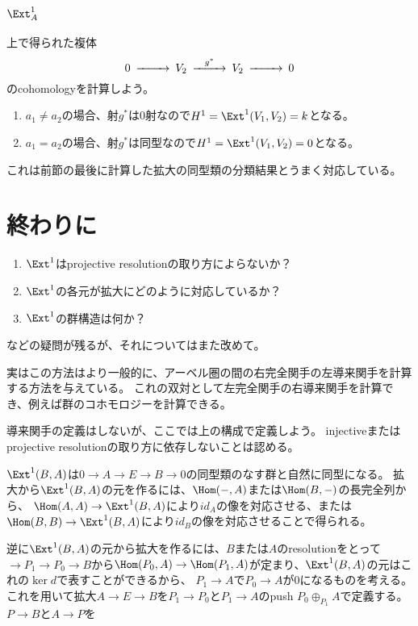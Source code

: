 \documentclass{jsarticle}
\begin{document}
\subsection{$\Ext^1_A$}
上で得られた複体
\[
\begin{CD}
0 @>>> V_2 @>g^*>> V_2 @>>> 0\\
\end{CD}
\]
のcohomologyを計算しよう。
\begin{enumerate}
\item $a_1\neq a_2$の場合、射$g^*$は$0$射なので$H^1=\Ext^1(V_1, V_2)=k$となる。
\item $a_1=a_2$の場合、射$g^*$は同型なので$H^1=\Ext^1(V_1, V_2)=0$となる。
\end{enumerate}

これは前節の最後に計算した拡大の同型類の分類結果とうまく対応している。

\section{終わりに}
\begin{enumerate}
\item $\Ext^1$はprojective resolutionの取り方によらないか？
\item $\Ext^1$の各元が拡大にどのように対応しているか？
\item $\Ext^1$の群構造は何か？
\end{enumerate}
などの疑問が残るが、それについてはまた改めて。

実はこの方法はより一般的に、アーベル圏の間の右完全関手の左導来関手を計算する方法を与えている。
これの双対として左完全関手の右導来関手を計算でき、例えば群のコホモロジーを計算できる。

導来関手の定義はしないが、ここでは上の構成で定義しよう。
injectiveまたはprojective resolutionの取り方に依存しないことは認める。

$\Ext^1(B,A)$は$0\to A\to E \to B\to 0$の同型類のなす群と自然に同型になる。
拡大から$\Ext^1(B,A)$の元を作るには、$\Hom(-,A)$または$\Hom(B,-)$の長完全列から、
$\Hom(A,A) \to \Ext^1(B,A)$により$id_A$の像を対応させる、または
$\Hom(B,B) \to \Ext^1(B,A)$により$id_B$の像を対応させることで得られる。

逆に$\Ext^1(B,A)$の元から拡大を作るには、$B$または$A$のresolutionをとって
$\to P_1 \to P_0 \to B$から$\Hom(P_0,A) \to \Hom(P_1,A)$が定まり、$\Ext^1(B,A)$の元はこれの$\ker d$で表すことができるから、
$P_1 \to A$で$P_0 \to A$が$0$になるものを考える。
これを用いて拡大$A \to E \to B$を$P_1 \to P_0$と$P_1 \to A$のpush $P_0 \oplus_{P_1}A$で定義する。
$P \to B$と$A \to P$を
\end{document}
